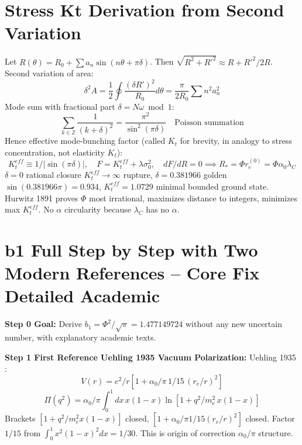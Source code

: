 \documentclass[11pt,a4paper]{article}
\begin{document}
\section{Stress Kt Derivation from Second Variation}
Let $R(\theta)=R_0+\sum a_n\sin(n\theta+\pi\delta)$. Then $\sqrt{R^2+R'^2}\approx R+R'^2/2R$. Second variation of area:
\begin{equation} \delta^2A=\frac12\oint\frac{(\delta R')^2}{R_0}d\theta=\frac{\pi}{2R_0}\sum n^2a_n^2 \end{equation}
Mode sum with fractional part $\delta=N\omega\bmod1$:
\begin{equation} \sum_{k\in\mathbb{Z}}\frac1{(k+\delta)^2}=\frac{\pi^2}{\sin^2(\pi\delta)}\quad\text{Poisson summation} \end{equation}
Hence effective mode-bunching factor (called $K_t$ for brevity, in analogy to stress concentration, not elasticity $K_t$):
\begin{equation} K_t^{eff}\equiv1/|\sin(\pi\delta)|,\quad F=K_t^{eff}+\lambda\sigma_0^2,\quad dF/dR=0\implies R_*=\Phi r_e^{(0)}=\Phi\alpha_0\lambda_C \end{equation}
$\delta=0$ rational closure $K_t^{eff}\to\infty$ rupture, $\delta=0.381966$ golden $\sin(0.381966\pi)=0.934$, $K_t^{eff}=1.0729$ minimal bounded ground state. Hurwitz 1891 proves $\Phi$ most irrational, maximizes distance to integers, minimizes max $K_t^{eff}$. No $\alpha$ circularity because $\lambda_C$ has no $\alpha$.

\section{b1 Full Step by Step with Two Modern References -- Core Fix Detailed Academic}

\textbf{Step 0 Goal:} Derive $b_1=\Phi^2/\sqrt{\pi}=1.477149724$ without any new uncertain number, with explanatory academic texts.

\textbf{Step 1 First Reference Uehling 1935 Vacuum Polarization:}
Uehling 1935 \cite{Uehling1935}:
\begin{equation} V(r)=e^2/r\left[1+\alpha_0/\pi\,1/15\,(r_e/r)^2\right] \end{equation}
\begin{equation} \Pi(q^2)=\alpha_0/\pi\int_0^1dx\,x(1-x)\ln\left[1+q^2/m_e^2\,x(1-x)\right] \end{equation}
Brackets $[1+q^2/m_e^2x(1-x)]$ closed, $[1+\alpha_0/\pi1/15(r_e/r)^2]$ closed. Factor $1/15$ from $\int_0^1x^2(1-x)^2dx=1/30$. This is origin of correction $\alpha_0/\pi$ structure.
\end{document}
